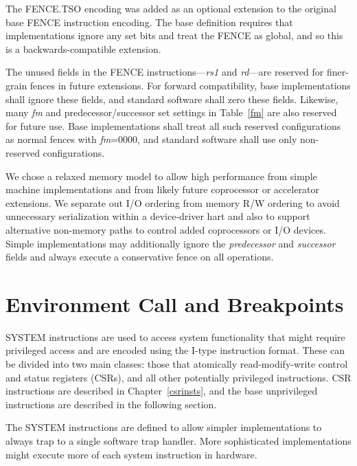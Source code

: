 \begin{commentary}
  The FENCE.TSO encoding was added as an optional extension to the
  original base FENCE instruction encoding.  The base definition
  requires that implementations ignore any set bits and treat the
  FENCE as global, and so this is a backwards-compatible extension.
\end{commentary}

The unused fields in the FENCE instructions---{\em rs1} and {\em rd}---are
reserved for finer-grain fences in future extensions.  For forward
compatibility, base implementations shall ignore these fields, and standard
software shall zero these fields.  Likewise, many {\em fm} and
predecessor/successor set settings in Table~\ref{fm} are also reserved
for future use.  Base implementations shall treat all such reserved
configurations as normal fences with {\em fm}=0000, and standard
software shall use only non-reserved configurations.

\begin{commentary}
We chose a relaxed memory model to allow high performance from simple
machine implementations and from likely future
coprocessor or accelerator extensions.  We separate out I/O ordering
from memory R/W ordering to avoid unnecessary serialization within a
device-driver hart and also to support alternative non-memory paths
to control added coprocessors or I/O devices.  Simple implementations
may additionally ignore the {\em predecessor} and {\em successor}
fields and always execute a conservative fence on all operations.
\end{commentary}

\section{Environment Call and Breakpoints}

SYSTEM instructions are used to access system functionality that might
require privileged access and are encoded using the I-type instruction
format.  These can be divided into two main classes: those that
atomically read-modify-write control and status registers (CSRs), and
all other potentially privileged instructions. CSR instructions are
described in Chapter~\ref{csrinsts}, and the base unprivileged instructions
are described in the following section.

\begin{commentary}
The SYSTEM instructions are defined to allow simpler implementations
to always trap to a single software trap handler.  More sophisticated
implementations might execute more of each system instruction in
hardware.
\end{commentary}

